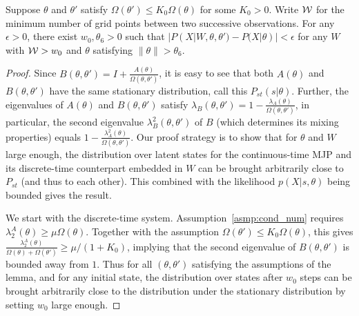 \begin{lemma}
Suppose $\theta$ and $\theta'$ satisfy $\Omega(\theta') \leq K_0
\Omega(\theta)$ for some $K_0 > 0$. Write ${\mathcal W}$ for the
minimum number of grid points between two successive observations.
For any $\epsilon > 0$, there exist  $w_0, \theta_6 > 0$ such that
$|P(X| W, \theta, \theta') - P(X | \theta)| < \epsilon$
for any $W$ with ${\mathcal W} > w_0$ and $\theta $ satisfying $\| \theta \| > \theta_6$.
\label{lem:eigenvalue_lemma}
\end{lemma}
\begin{proof}
Since $B(\theta, \theta') = I+\frac{A(\theta)}{\Omega(\theta, \theta')}$,
it is easy to see that both $A(\theta)$ and $B(\theta,\theta')$ have
the same stationary distribution, call this $P_{st}(s|\theta)$. Further,
the eigenvalues of $A(\theta)$ and $B(\theta,\theta')$ satisfy
$\lambda_B(\theta, \theta') = 1 - \frac{\lambda_A(\theta)}{\Omega(\theta,
\theta')}$, in particular, the second eigenvalue
$\lambda^2_B(\theta,\theta')$ of $B$ (which determines its mixing
properties) equals $1 - \frac{\lambda^2_A(\theta)}{\Omega(\theta, \theta')}$.
Our proof strategy is to show that for $\theta$ and $W$ large enough, the
distribution over latent states for the continuous-time MJP and
its discrete-time counterpart embedded in $W$ can be brought arbitrarily
close to $P_{st}$ (and thus to each other). This combined with the
likelihood $p(X|s, \theta)$ being bounded  gives the result.

We start with the discrete-time system.
Assumption~\ref{asmp:cond_num} requires
$\lambda^A_2(\theta) \geq \mu \Omega(\theta)$.
Together with the assumption $\Omega(\theta') \leq K_0 \Omega(\theta)$,
this gives
$\frac{\lambda^A_2(\theta)}{\Omega(\theta) + \Omega(\theta')} \geq
\mu / (1 + K_0) $, implying that the second eigenvalue of
$B(\theta, \theta')$ is bounded away from $1$.
Thus for all $(\theta,\theta')$ satisfying the assumptions of the lemma,
and for any initial state, the distribution over states after $w_0$ steps
can be brought arbitrarily close to the distribution under the
stationary distribution by setting $w_0$ large enough.



\end{proof}
